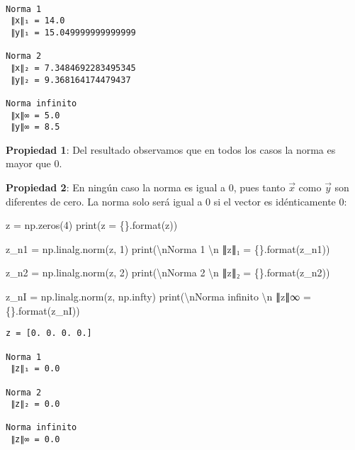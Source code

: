\documentclass[
  letterpaper,
  DIV=11,
  numbers=noendperiod]{scrreprt}
\newenvironment{Shaded}{\begin{snugshade}}{\end{snugshade}}
\newcommand{\BuiltInTok}[1]{\textcolor[rgb]{0.00,0.23,0.31}{#1}}
\newcommand{\CharTok}[1]{\textcolor[rgb]{0.13,0.47,0.30}{#1}}
\newcommand{\DecValTok}[1]{\textcolor[rgb]{0.68,0.00,0.00}{#1}}
\newcommand{\NormalTok}[1]{\textcolor[rgb]{0.00,0.23,0.31}{#1}}
\newcommand{\OperatorTok}[1]{\textcolor[rgb]{0.37,0.37,0.37}{#1}}
\newcommand{\SpecialCharTok}[1]{\textcolor[rgb]{0.37,0.37,0.37}{#1}}
\newcommand{\StringTok}[1]{\textcolor[rgb]{0.13,0.47,0.30}{#1}}
\begin{document}
\begin{verbatim}

Norma 1 
 ∥x∥₁ = 14.0 
 ∥y∥₁ = 15.049999999999999

Norma 2 
 ∥x∥₂ = 7.3484692283495345 
 ∥y∥₂ = 9.368164174479437

Norma infinito 
 ∥x∥∞ = 5.0 
 ∥y∥∞ = 8.5
\end{verbatim}

\textbf{Propiedad 1}: Del resultado observamos que en todos los casos la
norma es mayor que \(0\).

\textbf{Propiedad 2}: En ningún caso la norma es igual a \(0\), pues
tanto \(\vec{x}\) como \(\vec{y}\) son diferentes de cero. La norma solo
será igual a \(0\) si el vector es idénticamente \(0\):

\begin{Shaded}
\begin{Highlighting}[]
\NormalTok{z }\OperatorTok{=}\NormalTok{ np.zeros(}\DecValTok{4}\NormalTok{)}
\BuiltInTok{print}\NormalTok{(}\StringTok{\textquotesingle{}z = }\SpecialCharTok{\{\}}\StringTok{\textquotesingle{}}\NormalTok{.}\BuiltInTok{format}\NormalTok{(z))}

\NormalTok{z\_n1 }\OperatorTok{=}\NormalTok{ np.linalg.norm(z, }\DecValTok{1}\NormalTok{)}
\BuiltInTok{print}\NormalTok{(}\StringTok{\textquotesingle{}}\CharTok{\textbackslash{}n}\StringTok{Norma 1 }\CharTok{\textbackslash{}n}\StringTok{ ∥z∥₁ = }\SpecialCharTok{\{\}}\StringTok{\textquotesingle{}}\NormalTok{.}\BuiltInTok{format}\NormalTok{(z\_n1))}

\NormalTok{z\_n2 }\OperatorTok{=}\NormalTok{ np.linalg.norm(z, }\DecValTok{2}\NormalTok{)}
\BuiltInTok{print}\NormalTok{(}\StringTok{\textquotesingle{}}\CharTok{\textbackslash{}n}\StringTok{Norma 2 }\CharTok{\textbackslash{}n}\StringTok{ ∥z∥₂ = }\SpecialCharTok{\{\}}\StringTok{\textquotesingle{}}\NormalTok{.}\BuiltInTok{format}\NormalTok{(z\_n2))}

\NormalTok{z\_nI }\OperatorTok{=}\NormalTok{ np.linalg.norm(z, np.infty)}
\BuiltInTok{print}\NormalTok{(}\StringTok{\textquotesingle{}}\CharTok{\textbackslash{}n}\StringTok{Norma infinito }\CharTok{\textbackslash{}n}\StringTok{ ∥z∥∞ = }\SpecialCharTok{\{\}}\StringTok{\textquotesingle{}}\NormalTok{.}\BuiltInTok{format}\NormalTok{(z\_nI))}
\end{Highlighting}
\end{Shaded}

\begin{verbatim}
z = [0. 0. 0. 0.]

Norma 1 
 ∥z∥₁ = 0.0

Norma 2 
 ∥z∥₂ = 0.0

Norma infinito 
 ∥z∥∞ = 0.0
\end{verbatim}
\end{document}
